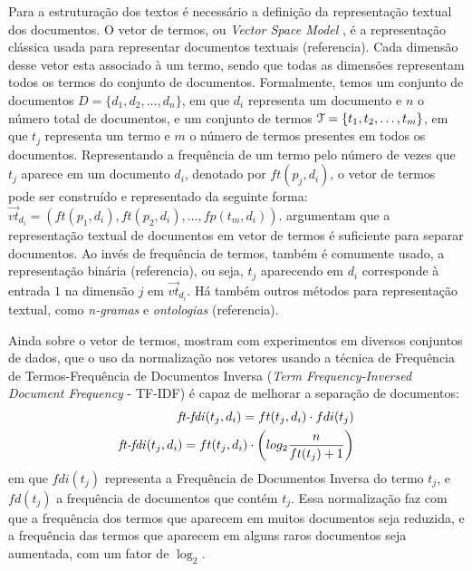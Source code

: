 \documentclass[normaltoc, espacoumemeio, pnumromarab,ruledheader]{abnt}
\begin{document}
Para a estruturação dos textos é necessário a definição da representação textual dos documentos.
O vetor de termos, ou \textit{Vector Space Model} \cite{Salton1975}, é a representação clássica usada para representar documentos textuais (referencia). Cada dimensão desse vetor esta associado à um termo, sendo que todas as dimensões representam todos os termos do conjunto de documentos.
Formalmente, temos um conjunto de documentos $D = \{ d_1, d_2, \dots, d_n \}$, em que $d_i$ representa um documento e $n$ o número total de documentos, e um conjunto de termos ${\cal T} = \{ t_1, t_2, \dots, t_m \}$, em que $t_j$ representa um termo e $m$ o número de termos presentes em todos os documentos.
Representando a frequência de um termo pelo número de vezes que $t_j$ aparece em um documento $d_i$, denotado por $ft(p_j, d_i)$, o vetor de termos pode ser construído e representado da seguinte forma: $\vec{vt}_{d_i} = ( ft(p_1, d_i), ft(p_2, d_i), \dots, fp(t_m, d_i) )$.
 argumentam que a representação textual de documentos em vetor de termos é suficiente para separar documentos.
Ao invés de frequência de termos, também é comumente usado, a representação binária (referencia), ou seja, $t_j$ aparecendo em $d_i$ corresponde à entrada $1$ na dimensão $j$ em $\vec{vt}_{d_i}$.
Há também outros métodos para representação textual, como \textit{n-gramas} e \textit{ontologias} (referencia).

Ainda sobre o vetor de termos,  mostram com experimentos em diversos conjuntos de dados, que o uso da normalização nos vetores usando a técnica de Frequência de Termos-Frequência de Documentos Inversa (\textit{Term Frequency-Inversed Document Frequency} - TF-IDF) é capaz de melhorar a separação de documentos:
\begin{equation}
\begin{split}
    \text{\textit{ft-fdi}}(t_j, d_i) = ft(t_j, d_i) \cdot fdi(t_j) \\
    \text{\textit{ft-fdi}}(t_j, d_i) = ft(t_j, d_i) \cdot \left( log_{2} \frac{n}{ft(t_j) + 1} \right)
\end{split}
\end{equation}
em que $fdi(t_j)$ representa a Frequência de Documentos Inversa do termo $t_j$, e $fd(t_j)$ a frequência de documentos que contém $t_j$. Essa normalização faz com que a frequência dos termos que aparecem em muitos documentos seja reduzida, e a frequência das termos que aparecem em alguns raros documentos seja aumentada, com um fator de $\log_{2}$.
\end{document}
